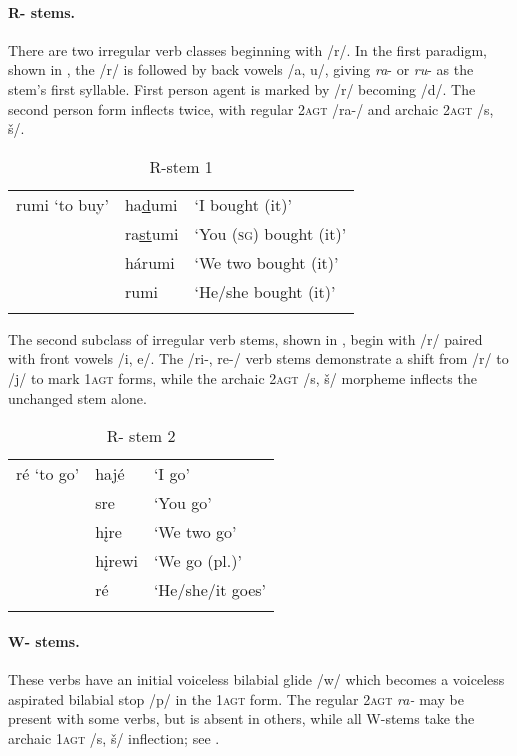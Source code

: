 \documentclass[output=paper]{LSP/langsci}
\begin{document}
\newpage
 \paragraph*{R- stems.}  There are two irregular verb classes beginning with /r/. In the first paradigm, shown in , the  /r/ is followed by back vowels /a, u/, giving \textit{ra}- or \textit{ru}- as the stem's first syllable.  First person agent is marked by /r/ becoming /d/.  The second person form inflects twice, with regular \textsc{2agt}  /ra-/ and archaic \textsc{2agt} /s, \v{s}/.			

\begin{table}
\caption{R-stem 1} \label{rstema}
\begin{tabular}{ l l l }
\lsptoprule
rumi `to buy' & ha\underline{d}umi & `I bought (it)' \\
& ra\underline{st}umi & `You (\textsc{sg}) bought (it)' \\
& hárumi	& `We two bought (it)' \\
& rumi	 & `He/she bought (it)' \\
\lspbottomrule
\end {tabular}
\end{table}

The second subclass of irregular verb stems, shown in , begin with /r/ paired with front vowels /i, e/. The /ri-, re-/ verb stems demonstrate a shift from /r/ to /j/ to mark \textsc{1agt}  forms,  while the archaic \textsc{2agt} /s, \v{s}/ morpheme inflects the unchanged stem alone.   

\begin{table}
\caption{R- stem 2} \label{rstemb}
\begin{tabular}{ l l l } 
\lsptoprule
ré `to go'  &	ha\underline{j}é  	& `I go' \\
& sre    &	`You go' \\
& h\k{i}re  & `We two go' \\
& h\k{i}rewi 	& `We go (pl.)' \\
& ré 	&	`He/she/it goes' \\
\lspbottomrule
\end {tabular}
\end{table}


\paragraph*{W- stems.} These verbs have an initial voiceless bilabial glide /w/ which becomes a voiceless aspirated bilabial stop /p/ in the \textsc{1agt} form. The regular \textsc{2agt} \textit{ra-} may be present with some verbs, but is absent in others, while all W-stems take the archaic \textsc{1agt} /s, \v{s}/ inflection; see .
\end{document}
